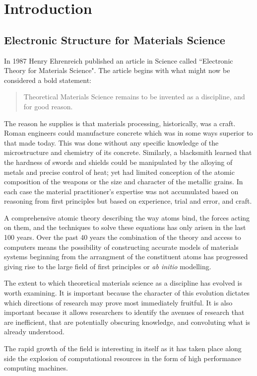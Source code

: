 \chapter{Introduction}
\section{Electronic Structure for Materials Science}
In 1987 Henry Ehrenreich published an article in Science called
``Electronic Theory for Materials Science". The article begins
with what might now be considered a bold statement:

\begin{quote}
Theoretical Materials Science remains to be invented as a discipline, and for good reason.
\end{quote}

The reason he supplies is that materials processing, historically, was a craft. 
Roman engineers could manufacture concrete which was in some ways superior to that
made today. This was done without any specific knowledge of the microstructure and chemistry 
of its concrete. Similarly, a blacksmith learned that the hardness of swords and shields could be manipulated 
by the alloying of metals and precise control of heat; yet had limited conception of 
the atomic composition of the weapons or the size and character of the metallic grains. 
In each case the material practitioner's expertise was not accumulated based on reasoning 
from first principles but based on experience, trial and error, and craft.

A comprehensive atomic theory describing the way atoms bind, the forces acting on them, 
and the techniques to solve these equations has only arisen in the last 100 years. 
Over the past 40 years the combination of the theory and access to computers 
means the possibility of constructing accurate models of materials 
systems beginning from the arrangment of the constituent atoms has
progressed giving rise to the large field of first principles or {\it ab initio} modelling.

The extent to which theoretical materials science as a discipline has evolved is worth examining. 
It is important because the character of this evolution dictates which directions of research may prove most
immediately fruitful. It is also important because it allows researchers to identify the avenues
of research that are inefficient, that are potentially obscuring knowledge, and convoluting 
what is already understood. 

The rapid growth of the field is interesting in itself as it has taken place along side
the explosion of computational resources in the form of high performance computing machines.

